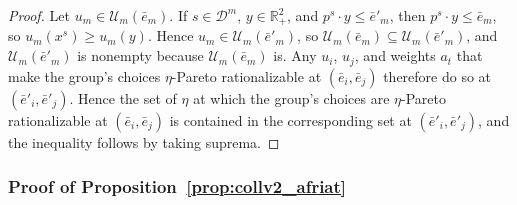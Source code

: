 \documentclass[11 pt]{article}
\begin{document}
\begin{proof}
Let $u_{m} \in \mathcal{U}_{m}(\bar e_{m})$. If $s \in \mathcal{D}^{m}$, $y \in \mathbb{R}^{2}_{+}$, and $p^{s} \cdot y \leq \bar e'_{m}$, then $p^{s} \cdot y \leq \bar e_{m}$, so $u_{m}(x^{s}) \geq u_{m}(y)$. Hence $u_{m} \in \mathcal{U}_{m}(\bar e'_{m})$, so $\mathcal{U}_{m}(\bar e_{m}) \subseteq \mathcal{U}_{m}(\bar e'_{m})$, and $\mathcal{U}_{m}(\bar e'_{m})$ is nonempty because $\mathcal{U}_{m}(\bar e_{m})$ is. Any $u_{i}$, $u_{j}$, and weights $a_{t}$ that make the group's choices $\eta$-Pareto rationalizable at $(\bar e_{i}, \bar e_{j})$ therefore do so at $(\bar e'_{i}, \bar e'_{j})$. Hence the set of $\eta$ at which the group's choices are $\eta$-Pareto rationalizable at $(\bar e_{i}, \bar e_{j})$ is contained in the corresponding set at $(\bar e'_{i}, \bar e'_{j})$, and the inequality follows by taking suprema.
\end{proof}

\subsubsection{Proof of Proposition~\ref{prop:collv2_afriat}}\label{subsec:app_collv2_afriat}
\end{document}
